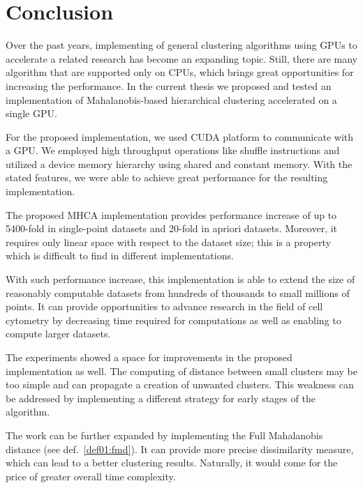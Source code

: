 \chapter*{Conclusion}

Over the past years, implementing of general clustering algorithms using GPUs to accelerate a related research has become an expanding topic. Still, there are many algorithm that are supported only on CPUs, which brings great opportunities for increasing the performance. In the current thesis we proposed and tested an implementation of Mahalanobis-based hierarchical clustering accelerated on a single GPU. 

For the proposed implementation, we used CUDA platform to communicate with a GPU. We employed high throughput operations like shuffle instructions and utilized a device memory hierarchy using shared and constant memory. With the stated features, we were able to achieve great performance for the resulting implementation.

The proposed MHCA implementation provides performance increase of up to 5400-fold in single-point datasets and 20-fold in apriori datasets. Moreover, it requires only linear space with respect to the dataset size; this is a property which is difficult to find in different implementations.

With such performance increase, this implementation is able to extend the size of reasonably computable datasets from hundreds of thousands to small millions of points. It can provide opportunities to advance research in the field of cell cytometry by decreasing time required for computations as well as enabling to compute larger datasets.

The experiments showed a space for improvements in the proposed implementation as well. The computing of distance between small clusters may be too simple and can propagate a creation of unwanted clusters. This weakness can be addressed by implementing a different strategy for early stages of the algorithm.

The work can be further expanded by implementing the Full Mahalanobis distance (see def.~\ref{def01:fmd}). It can provide more precise dissimilarity measure, which can lead to a better clustering results. Naturally, it would come for the price of greater overall time complexity. 